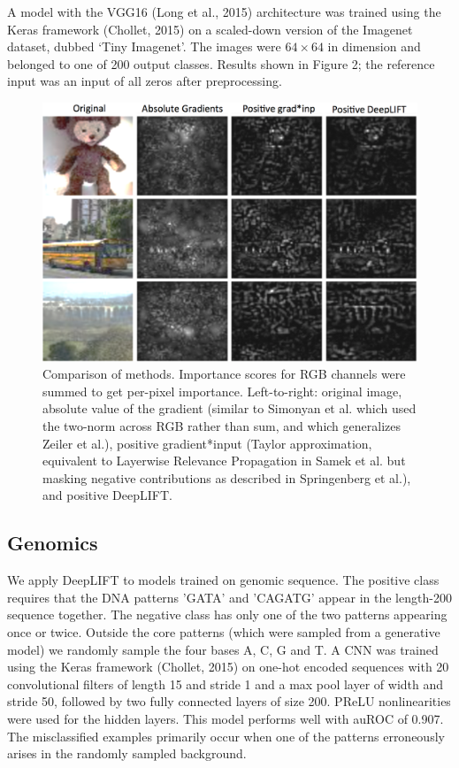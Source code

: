 \documentclass{article}
\begin{document}
A model with the VGG16 (Long et al., 2015) architecture was trained using the Keras framework (Chollet, 2015) on a scaled-down version of the Imagenet dataset, dubbed `Tiny Imagenet'. The images were $64 \times 64$ in dimension and belonged to one of 200 output classes. Results shown in Figure 2; the reference input was an input of all zeros after preprocessing.
\begin{figure}[!ht]
\begin{center}
\includegraphics[scale=0.3]{TinyImagenetDeepLIFT.png}
\caption{Comparison of methods. Importance scores for RGB channels were summed to get per-pixel importance. Left-to-right: original image, absolute value of the gradient (similar to Simonyan et al. which used the two-norm across RGB rather than sum, and which generalizes Zeiler et al.), positive gradient*input (Taylor approximation, equivalent to Layerwise Relevance Propagation in Samek et al. but masking negative contributions as described in Springenberg et al.), and positive DeepLIFT.}
\end{center}
\vspace{-20px}
\end{figure}
\subsection{Genomics}
We apply DeepLIFT to models trained on genomic sequence. The positive class requires that the DNA patterns 'GATA' and 'CAGATG' appear in the length-200 sequence together. The negative class has only one of the two patterns appearing once or twice. Outside the core patterns (which were sampled from a generative model) we randomly sample the four bases A, C, G and T. A CNN was trained using the Keras framework (Chollet, 2015) on one-hot encoded sequences with 20 convolutional filters of length 15 and stride 1 and a max pool layer of width and stride 50, followed by two fully connected layers of size 200. PReLU nonlinearities were used for the hidden layers. This model performs well with auROC of 0.907. The misclassified examples primarily occur when one of the patterns erroneously arises in the randomly sampled background. %
\end{document}

